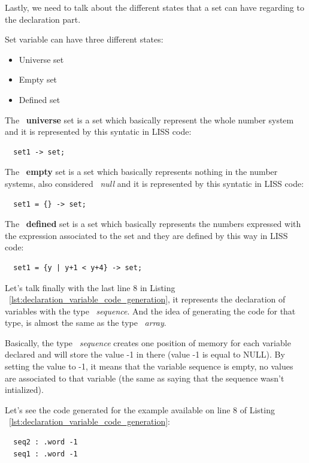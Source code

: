 \documentclass[
  oneside,
  11pt, a4paper,
  footinclude=true,
  headinclude=true,
  cleardoublepage=empty
]{scrbook}
\begin{document}
Lastly, we need to talk about the different states that a set can have regarding to the declaration part.

Set variable can have three different states:

\begin{itemize}
\item Universe set
\item Empty set
\item Defined set
\end{itemize}

The ~\textbf{universe} set is a set which basically represent the whole number system and it is represented by this syntatic in LISS code:

\begin{lstlisting}
  set1 -> set;
\end{lstlisting}

The ~\textbf{empty} set is a set which basically represents nothing in the number systems, also considered ~\textit{null} and it is represented by this syntatic in LISS code:

\begin{lstlisting}
  set1 = {} -> set;
\end{lstlisting}

The ~\textbf{defined} set is a set which basically represents the numbers expressed with the expression associated to the set and they are defined by this way in LISS code:

\begin{lstlisting}
  set1 = {y | y+1 < y+4} -> set;
\end{lstlisting}

Let's talk finally with the last line 8 in Listing ~\ref{lst:declaration_variable_code_generation}, it represents the declaration of variables with the type ~\textit{sequence}. And the idea of generating the code for that type, is almost the same as the type ~\textit{array}.

Basically, the type ~\textit{sequence} creates one position of memory for each variable declared and will store the value -1 in there (value -1 is equal to NULL). By setting the value to -1, it means that the variable sequence is empty, no values are associated to that variable (the same as saying that the sequence wasn't intialized).

Let's see the code generated for the example available on line 8 of Listing ~\ref{lst:declaration_variable_code_generation}:

\begin{lstlisting}
  seq2 : .word -1		
  seq1 : .word -1		
\end{lstlisting}
\end{document}
